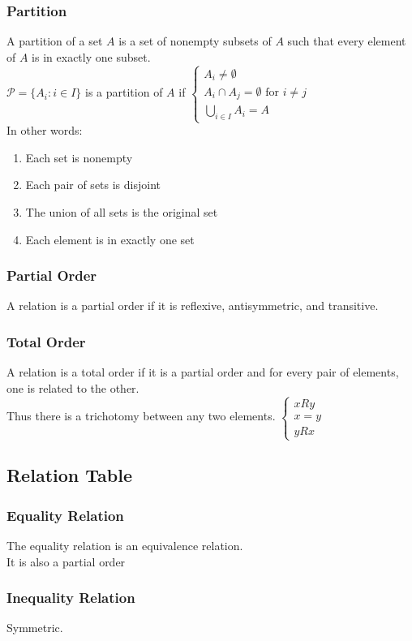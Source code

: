 \documentclass{article}
\begin{document}
\subsubsection*{Partition}
A partition of a set $A$ is a set of nonempty subsets of $A$ such that every element of $A$ is in exactly one subset.\\
$\mathscr{P} = \{A_i : i \in I\}$ is a partition of $A$ if $\begin{cases}
    A_i \neq \emptyset\\
    A_i \cap A_j = \emptyset \text{ for } i \neq j\\
    \bigcup_{i \in I} A_i = A
\end{cases}$\\
In other words: \begin{enumerate}
    \item Each set is nonempty
    \item Each pair of sets is disjoint
    \item The union of all sets is the original set 
    \item Each element is in exactly one set
\end{enumerate}
\subsubsection*{Partial Order}
A relation is a partial order if it is reflexive, antisymmetric, and transitive.
\subsubsection*{Total Order}
A relation is a total order if it is a partial order and for every pair of elements, one is related to the other.\\
Thus there is a trichotomy between any two elements.
$\begin{cases}
    xRy\\
    x = y\\
    yRx
\end{cases}$
\subsection*{Relation Table}
\subsubsection*{Equality Relation}
The equality relation is an equivalence relation.\\
It is also a partial order 
\subsubsection*{Inequality Relation}
Symmetric. 
\end{document}
